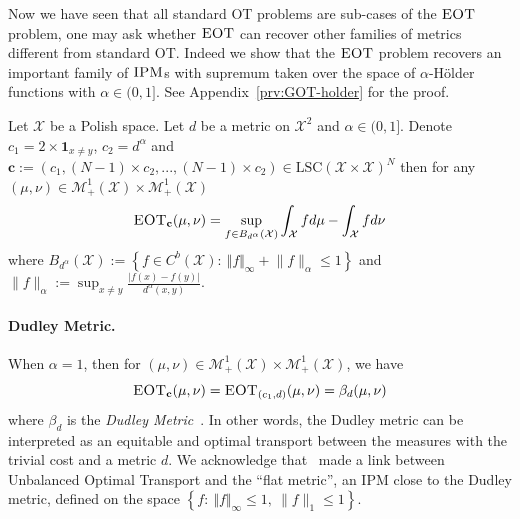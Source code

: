 Now we have seen that all standard OT problems are sub-cases of the $\textsc{EOT}$ problem, one may ask whether $\textsc{EOT}$ can recover other families of metrics different from standard OT. Indeed we show that the $\textsc{EOT}$ problem recovers an important family of $\textsc{IPM}$s with supremum taken over the space of $\alpha$-Hölder functions with $\alpha\in (0,1]$. See Appendix~\ref{prv:GOT-holder} for the proof.
\begin{prop} 
\label{prop:GOT-holder}
Let $\mathcal{X}$ be a Polish space. Let $d$ be a metric on $\mathcal{X}^2$ and $\alpha\in (0,1]$. Denote $c_1= 2\times\mathbf{1}_{x\neq y}$, $c_2=d^{\alpha}$ and $\mathbf{c}:=(c_1,(N-1)\times c_2,...,(N-1)\times c_2)\in \mathrm{LSC}(\mathcal{X}\times\mathcal{X})^N$
then for any $(\mu,\nu)\in\mathcal{M}_+^{1}(\mathcal{X})\times\mathcal{M}_+^{1}(\mathcal{X})$  
\begin{align}
\label{eq-holder}
    \textsc{EOT}_{\mathbf{c}}(\mu,\nu) =\sup_{f\in B_{d^{\alpha}}(\mathcal{X})} \int_{\mathcal{X}} f d\mu - \int_{\mathcal{X}} f d\nu
\end{align}
where $B_{d^{\alpha}}(\mathcal{X}):=\left\{f\in C^{b}(\mathcal{X})\mathrm{:}~\Vert f\Vert_{\infty}+\lVert f\rVert_\alpha\leq 1 \right\}$ and $\lVert f\rVert_\alpha := \sup_{x\neq y}\frac{|f(x)-f(y)|}{d^{\alpha}(x,y)}$.
\end{prop}

\paragraph{Dudley Metric.} When $\alpha=1$, then for $(\mu,\nu)\in\mathcal{M}_+^{1}(\mathcal{X})\times\mathcal{M}_+^{1}(\mathcal{X})$, we have 
$$\textsc{EOT}_{\mathbf{c}}(\mu,\nu) = \textsc{EOT}_{(c_1,d)}(\mu,\nu) = \beta_d(\mu,\nu)$$
where  $\beta_d$ is the \textit{Dudley Metric}~\citep{dudley1966weak}. In other words, the Dudley metric can be interpreted as an equitable and optimal transport between the measures with the trivial cost and a metric $d$. We acknowledge that~\cite{chizat2018unbalanced} made a link between Unbalanced Optimal Transport and the ``flat metric'', an IPM close to the Dudley metric, defined on the space $\left\{f\mathrm{:}~\Vert f\Vert_{\infty}\leq 1,~\lVert f\rVert_1\leq 1 \right\}$. 

